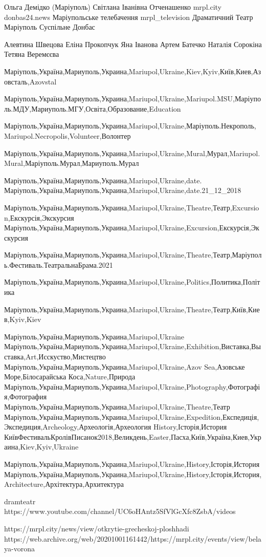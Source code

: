  
 
 
 
 

Ольга Демідко (Маріуполь)
Світлана Іванівна Отченашенко
mrpl.city
donbas24.news
Маріупольське телебачення mrpl_television
Драматичний Театр Маріуполь
Суспільне Донбас

Алевтина Швецова
Еліна Прокопчук
Яна Іванова
Артем Батечко
Наталія Сорокіна
Тетяна Веремєєва

Маріуполь,Україна,Мариуполь,Украина,Mariupol,Ukraine,Kiev,Kyiv,Київ,Киев,Азовсталь,Azovstal

Маріуполь,Україна,Мариуполь,Украина,Mariupol,Ukraine,Mariupol.MSU,Маріуполь.МДУ,Мариуполь.МГУ,Освіта,Образование,Education

Маріуполь,Україна,Мариуполь,Украина,Mariupol,Ukraine,Маріуполь.Некрополь,Mariupol.Necropolis,Volunteer,Волонтер

Маріуполь,Україна,Мариуполь,Украина,Mariupol,Ukraine,Mural,Мурал,Mariupol.Mural,Маріуполь.Мурал,Мариуполь.Мурал

Маріуполь,Україна,Мариуполь,Украина,Mariupol,Ukraine,date.
Маріуполь,Україна,Мариуполь,Украина,Mariupol,Ukraine,date.21_12_2018

Маріуполь,Україна,Мариуполь,Украина,Mariupol,Ukraine,Theatre,Театр,Excursion,Екскурсія,Экскурсия
Маріуполь,Україна,Мариуполь,Украина,Mariupol,Ukraine,Excursion,Екскурсія,Экскурсия

Маріуполь,Україна,Мариуполь,Украина,Mariupol,Ukraine,Theatre,Театр,Маріуполь.Фестиваль.ТеатральнаБрама.2021

Маріуполь,Україна,Мариуполь,Украина,Mariupol,Ukraine,Politics,Политика,Політика

Маріуполь,Україна,Мариуполь,Украина,Mariupol,Ukraine,Theatre,Театр,Київ,Киев,Kyiv,Kiev

Маріуполь,Україна,Мариуполь,Украина,Mariupol,Ukraine
Маріуполь,Україна,Мариуполь,Украина,Mariupol,Ukraine,Exhibition,Виставка,Выставка,Art,Исскуство,Мистецтво
Маріуполь,Україна,Мариуполь,Украина,Mariupol,Ukraine,Azov Sea,Азовське Море,Білосарайська Коса,Nature,Природа
Маріуполь,Україна,Мариуполь,Украина,Mariupol,Ukraine,Photography,Фотографія,Фотография
Маріуполь,Україна,Мариуполь,Украина,Mariupol,Ukraine,Theatre,Театр
Маріуполь,Україна,Мариуполь,Украина,Mariupol,Ukraine,Expedition,Експедиція,Экспедиция,Archeology,Археологія,Археология
History,Історія,История
КиївФестивальКролівПисанок2018,Великдень,Easter,Пасха,Київ,Україна,Киев,Украина,Kiev,Kyiv,Ukraine

Маріуполь,Україна,Мариуполь,Украина,Mariupol,Ukraine,History,Історія,История
Маріуполь,Україна,Мариуполь,Украина,Mariupol,Ukraine,History,Історія,История,Architecture,Архітектура,Архитектура

dramteatr
https://www.youtube.com/channel/UC6oHAntz5SfVlGcXfc8ZsbA/videos

https://mrpl.city/news/view/otkrytie-grecheskoj-ploshhadi
https://web.archive.org/web/20201001161442/https://mrpl.city/events/view/belaya-vorona


